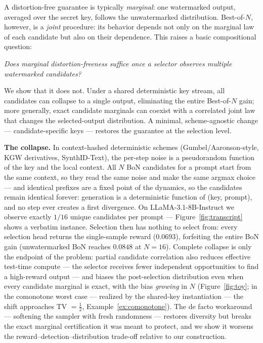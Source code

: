\documentclass{article} %
\begin{document}
A distortion-free guarantee is typically \emph{marginal}: one watermarked
output, averaged over the secret key, follows the unwatermarked distribution.
Best-of-$N$, however, is a \emph{joint} procedure: its behavior depends not
only on the marginal law of each candidate but also on their dependence. This
raises a basic compositional question:
\begin{center}
\emph{Does marginal distortion-freeness suffice once a selector observes
multiple watermarked candidates?}
\end{center}
We show that it does not. Under a shared deterministic key stream, all
candidates can collapse to a single output, eliminating the entire
Best-of-$N$ gain; more generally, exact candidate marginals can coexist with
a correlated joint law that changes the selected-output distribution. A
minimal, scheme-agnostic change --- candidate-specific keys --- restores the
guarantee at the selection level.

\textbf{The collapse.} In context-hashed deterministic schemes (Gumbel/Aaronson-style,
KGW derivatives, SynthID-Text), the per-step noise is a pseudorandom function of the
key and the local context. All $N$ BoN candidates for a prompt start from the same
context, so they read the same noise and make the same argmax choice --- and identical
prefixes are a fixed point of the dynamics, so the candidates remain identical
forever: generation is a deterministic function of (key, prompt), and no step ever
creates a first divergence. On LLaMA-3.1-8B-Instruct we observe exactly $1/16$
unique candidates per prompt --- Figure~\ref{fig:transcript} shows a verbatim
instance. Selection then has nothing to select from: every
selection head returns the single-sample reward ($0.0693$), forfeiting the entire
BoN gain (unwatermarked BoN reaches $0.0848$ at $N{=}16$). Complete collapse is
only the endpoint of the problem: partial candidate correlation also reduces
effective test-time compute --- the selector receives fewer independent
opportunities to find a high-reward output --- and biases the post-selection
distribution even when every candidate marginal is exact, with the bias
\emph{growing} in $N$ (Figure~\ref{fig:toy}; in the comonotone worst case ---
realized by the shared-key instantiation --- the shift approaches
TV $=\tfrac12$, Example~\ref{ex:comonotone}). The de facto workaround ---
softening the sampler with fresh randomness \citep{verma2025watermarking} ---
restores diversity but breaks the exact marginal certification it was meant to
protect, and we show it worsens the reward--detection--distribution trade-off
relative to our construction.
\end{document}
